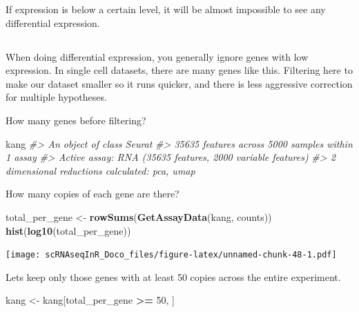 \documentclass[
]{book}
\newenvironment{Shaded}{\begin{snugshade}}{\end{snugshade}}
\newcommand{\CommentTok}[1]{\textcolor[rgb]{0.56,0.35,0.01}{\textit{#1}}}
\newcommand{\DecValTok}[1]{\textcolor[rgb]{0.00,0.00,0.81}{#1}}
\newcommand{\FunctionTok}[1]{\textcolor[rgb]{0.13,0.29,0.53}{\textbf{#1}}}
\newcommand{\NormalTok}[1]{#1}
\newcommand{\OtherTok}[1]{\textcolor[rgb]{0.56,0.35,0.01}{#1}}
\newcommand{\SpecialCharTok}[1]{\textcolor[rgb]{0.81,0.36,0.00}{\textbf{#1}}}
\newcommand{\StringTok}[1]{\textcolor[rgb]{0.31,0.60,0.02}{#1}}
\begin{document}
If expression is below a certain level, it will be almost impossible to see any differential expression.

\hypertarget{section-11}{%
\subsection*{}\label{section-11}}

When doing differential expression, you generally ignore genes with low expression.
In single cell datasets, there are many genes like this. Filtering here to make our dataset smaller so it runs quicker, and there is less aggressive correction for multiple hypotheses.

How many genes before filtering?

\begin{Shaded}
\begin{Highlighting}[]
\NormalTok{kang}
\CommentTok{\#\textgreater{} An object of class Seurat }
\CommentTok{\#\textgreater{} 35635 features across 5000 samples within 1 assay }
\CommentTok{\#\textgreater{} Active assay: RNA (35635 features, 2000 variable features)}
\CommentTok{\#\textgreater{}  2 dimensional reductions calculated: pca, umap}
\end{Highlighting}
\end{Shaded}

How many copies of each gene are there?

\begin{Shaded}
\begin{Highlighting}[]
\NormalTok{total\_per\_gene }\OtherTok{\textless{}{-}} \FunctionTok{rowSums}\NormalTok{(}\FunctionTok{GetAssayData}\NormalTok{(kang, }\StringTok{\textquotesingle{}counts\textquotesingle{}}\NormalTok{))}
\FunctionTok{hist}\NormalTok{(}\FunctionTok{log10}\NormalTok{(total\_per\_gene))}
\end{Highlighting}
\end{Shaded}

\texttt{[image: scRNAseqInR\_Doco\_files/figure-latex/unnamed-chunk-48-1.pdf]}

Lets keep only those genes with at least 50 copies across the entire experiment.

\begin{Shaded}
\begin{Highlighting}[]
\NormalTok{kang }\OtherTok{\textless{}{-}}\NormalTok{ kang[total\_per\_gene }\SpecialCharTok{\textgreater{}=} \DecValTok{50}\NormalTok{, ] }
\end{Highlighting}
\end{Shaded}
\end{document}
